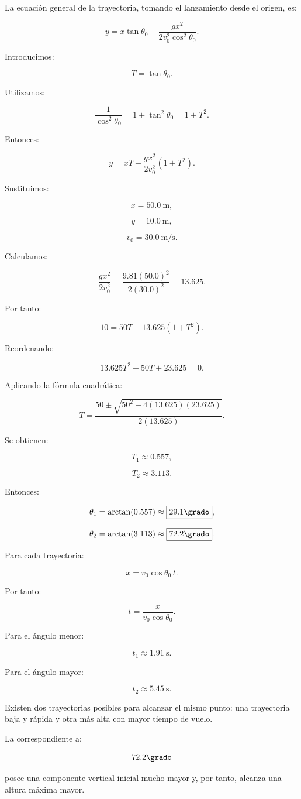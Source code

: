\begin{explicacion}
La ecuación general de la trayectoria, tomando el lanzamiento desde el origen,
es:

\[
y
=
x\tan\theta_0
-
\frac{
gx^2
}{
2v_0^2\cos^2\theta_0
}.
\]

Introducimos:

\[
T=\tan\theta_0.
\]

Utilizamos:

\[
\frac{1}{\cos^2\theta_0}
=
1+\tan^2\theta_0
=
1+T^2.
\]

Entonces:

\[
y
=
xT
-
\frac{gx^2}{2v_0^2}
(1+T^2).
\]

Sustituimos:

\[
x=\SI{50.0}{\meter},
\]

\[
y=\SI{10.0}{\meter},
\]

\[
v_0=\SI{30.0}{\meter\per\second}.
\]

Calculamos:

\[
\frac{gx^2}{2v_0^2}
=
\frac{
9.81(50.0)^2
}{
2(30.0)^2
}
=
13.625.
\]

Por tanto:

\[
10
=
50T
-
13.625(1+T^2).
\]

Reordenando:

\[
13.625T^2
-
50T
+
23.625
=
0.
\]

Aplicando la fórmula cuadrática:

\[
T
=
\frac{
50
\pm
\sqrt{
50^2
-
4(13.625)(23.625)
}
}{
2(13.625)
}.
\]

Se obtienen:

\[
T_1\approx0.557,
\]

\[
T_2\approx3.113.
\]

Entonces:

\[
\theta_1
=
\arctan(0.557)
\approx
\boxed{29.1\grado},
\]

\[
\theta_2
=
\arctan(3.113)
\approx
\boxed{72.2\grado}.
\]

Para cada trayectoria:

\[
x
=
v_0\cos\theta_0\,t.
\]

Por tanto:

\[
t
=
\frac{x}
{v_0\cos\theta_0}.
\]

Para el ángulo menor:

\[
\boxed{
t_1\approx\SI{1.91}{\second}
}.
\]

Para el ángulo mayor:

\[
\boxed{
t_2\approx\SI{5.45}{\second}
}.
\]

Existen dos trayectorias posibles para alcanzar el mismo punto: una trayectoria
baja y rápida y otra más alta con mayor tiempo de vuelo.

La correspondiente a:

\[
72.2\grado
\]

posee una componente vertical inicial mucho mayor y, por tanto, alcanza una
altura máxima mayor.
\end{explicacion}


